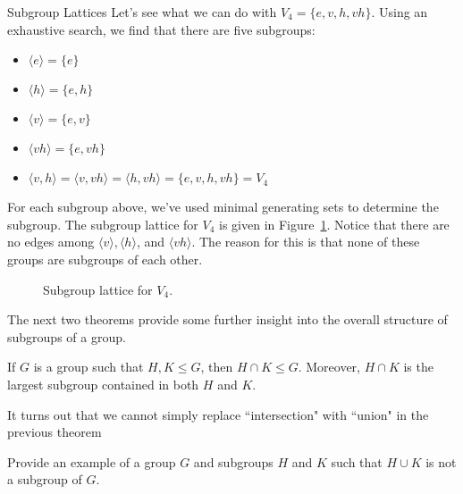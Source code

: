 \begin{section}{Subgroup Lattices}
Let's see what we can do with $V_4=\{e,v,h,vh\}$.  Using an exhaustive search, we find that there are five subgroups:
\begin{itemize}
\item[] $\langle e \rangle = \{e\}$
\item[] $\langle h \rangle  = \{e,h\}$
\item[] $\langle v \rangle  = \{e,v\}$
\item[] $\langle vh \rangle  = \{e,vh\}$
\item[] $\langle v,h \rangle = \langle v,vh\rangle = \langle h, vh\rangle= \{e,v,h,vh\}=V_4$
\end{itemize}
For each subgroup above, we've used minimal generating sets to determine the subgroup.  The subgroup lattice for $V_4$ is given in Figure~\ref{fig:latticeV4}. Notice that there are no edges among $\langle v\rangle, \langle h\rangle$, and $\langle vh\rangle$.  The reason for this is that none of these groups are subgroups of each other.

\begin{figure}[!ht]
\centering
{}
\caption{Subgroup lattice for $V_4$.}
\label{fig:latticeV4}
\end{figure}

The next two theorems provide some further insight into the overall structure of subgroups of a group.

\begin{theorem}\label{thm:subgroup_intersection}
If $G$ is a group such that $H,K\leq G$, then $H\cap K\leq G$. Moreover, $H\cap K$ is the largest subgroup contained in both $H$ and $K$.
\end{theorem}

It turns out that we cannot simply replace ``intersection" with ``union" in the previous theorem

\begin{problem}
Provide an example of a group $G$ and subgroups $H$ and $K$ such that $H\cup K$ is not a subgroup of $G$.
\end{problem}


\end{section}
